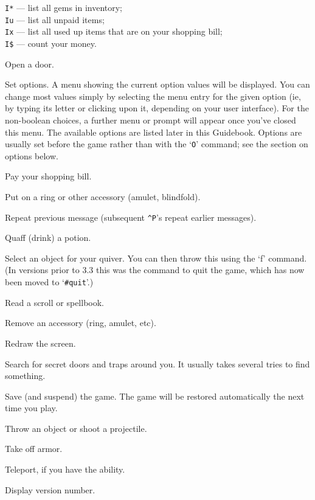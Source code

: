 {\tt I*} --- list all gems in inventory;\\
{\tt Iu} --- list all unpaid items;\\
{\tt Ix} --- list all used up items that are on your shopping bill;\\
{\tt I\$} --- count your money.
\item[\tb{o}]
Open a door.
\item[\tb{O}]
Set options.  A menu showing the current option values will be
displayed.  You can change most values simply by selecting the menu
entry for the given option (ie, by typing its letter or clicking upon
it, depending on your user interface).  For the non-boolean choices,
a further menu or prompt will appear once you've closed this menu.
The available options
are listed later in this Guidebook.  Options are usually set before the
game rather than with the `{\tt O}' command; see the section on options below.
\item[\tb{p}]
Pay your shopping bill.
\item[\tb{P}]
Put on a ring or other accessory (amulet, blindfold).
\item[\tb{\^{}P}]
Repeat previous message (subsequent {\tt \^{}P}'s repeat earlier messages).
\item[\tb{q}]
Quaff (drink) a potion.
\item[\tb{Q}]
Select an object for your quiver.  You can then throw this using
the `f' command.  (In versions prior to 3.3 this was the command to quit
the game, which has now been moved to `{\tt \#quit}'.)
\item[\tb{r}]
Read a scroll or spellbook.
\item[\tb{R}]
Remove an accessory (ring, amulet, etc).
\item[\tb{\^{}R}]
Redraw the screen.
\item[\tb{s}]
Search for secret doors and traps around you.  It usually takes several
tries to find something.
\item[\tb{S}]
Save (and suspend) the game.  The game will be restored automatically the
next time you play.
\item[\tb{t}]
Throw an object or shoot a projectile.
\item[\tb{T}]
Take off armor.
\item[\tb{\^{}T}]
Teleport, if you have the ability.
\item[\tb{v}]
Display version number.
\item[\tb{V}]
